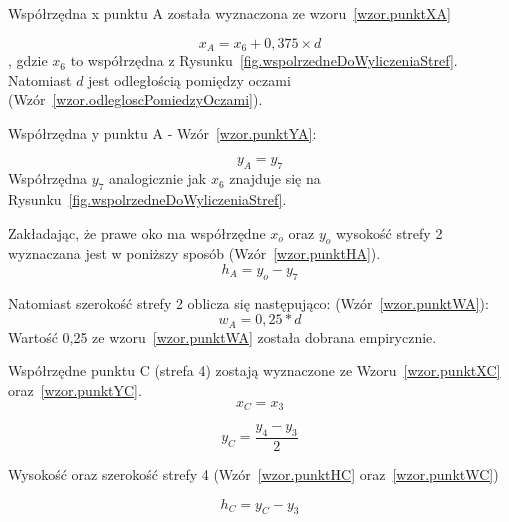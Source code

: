 \documentclass[a4paper,twoside,12pt]{book}
\begin{document}
    Współrzędna x punktu A została wyznaczona ze wzoru~\ref{wzor.punktXA}

    \large
    \begin{equation}
        x_{A}=x_{6} + 0,375 \times d
        \label{wzor.punktXA}
    \end{equation}
    \normalsize
    , gdzie $x_{6}$ to współrzędna z Rysunku~\ref{fig.wspolrzedneDoWyliczeniaStref}.
    Natomiast $d$ jest odległością pomiędzy oczami (Wzór~\ref{wzor.odlegloscPomiedzyOczami}).

    Współrzędna y punktu A - Wzór~\ref{wzor.punktYA}:

    \large
    \begin{equation}
        y_{A}=y_{7}
        \label{wzor.punktYA}
    \end{equation}
    \normalsize
    Współrzędna $y_{7}$ analogicznie jak $x_{6}$ znajduje się na Rysunku~\ref{fig.wspolrzedneDoWyliczeniaStref}.

    Zakładając, że prawe oko ma współrzędne $x_{o}$ oraz  $y_{o}$ wysokość strefy 2 wyznaczana jest w poniższy sposób
    (Wzór~\ref{wzor.punktHA}).
    \large
    \begin{equation}
        h_{A}=y_{o}-y_{7}
        \label{wzor.punktHA}
    \end{equation}
    \normalsize

    Natomiast szerokość strefy 2 oblicza się następująco: (Wzór~\ref{wzor.punktWA}):
    \large
    \begin{equation}
        w_{A}=0,25 * d
        \label{wzor.punktWA}
    \end{equation}
    \normalsize
    Wartość 0,25 ze wzoru~\ref{wzor.punktWA} została dobrana empirycznie.

    Współrzędne punktu C (strefa 4) zostają wyznaczone ze Wzoru~\ref{wzor.punktXC} oraz~\ref{wzor.punktYC}.
    \large
    \begin{equation}
        x_{C}=x_{3}
        \label{wzor.punktXC}
    \end{equation}
    \normalsize

    \large
    \begin{equation}
        y_{C}= \frac{y_{4} - y_{3}}{2}
        \label{wzor.punktYC}
    \end{equation}
    \normalsize

    Wysokość oraz szerokość strefy 4 (Wzór~\ref{wzor.punktHC} oraz~\ref{wzor.punktWC})

    \large
    \begin{equation}
        h_{C}=y_{C} - y_{3}
        \label{wzor.punktHC}
    \end{equation}
    \normalsize
\end{document}
